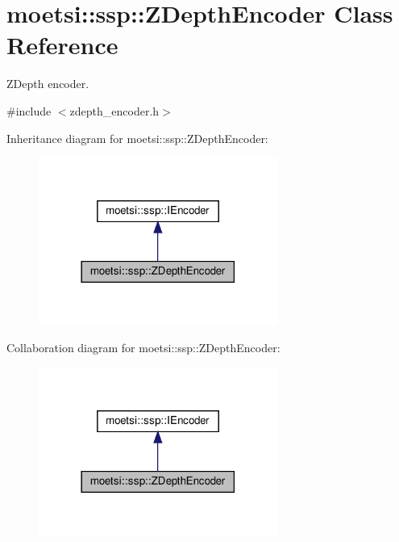 \hypertarget{classmoetsi_1_1ssp_1_1ZDepthEncoder}{}\section{moetsi\+:\+:ssp\+:\+:Z\+Depth\+Encoder Class Reference}
\label{classmoetsi_1_1ssp_1_1ZDepthEncoder}


Z\+Depth encoder.  




{\ttfamily \#include $<$zdepth\+\_\+encoder.\+h$>$}



Inheritance diagram for moetsi\+:\+:ssp\+:\+:Z\+Depth\+Encoder\+:\nopagebreak
\begin{figure}[H]
\begin{center}
\leavevmode
\includegraphics[width=222pt]{classmoetsi_1_1ssp_1_1ZDepthEncoder__inherit__graph}
\end{center}
\end{figure}


Collaboration diagram for moetsi\+:\+:ssp\+:\+:Z\+Depth\+Encoder\+:\nopagebreak
\begin{figure}[H]
\begin{center}
\leavevmode
\includegraphics[width=222pt]{classmoetsi_1_1ssp_1_1ZDepthEncoder__coll__graph}
\end{center}
\end{figure}
